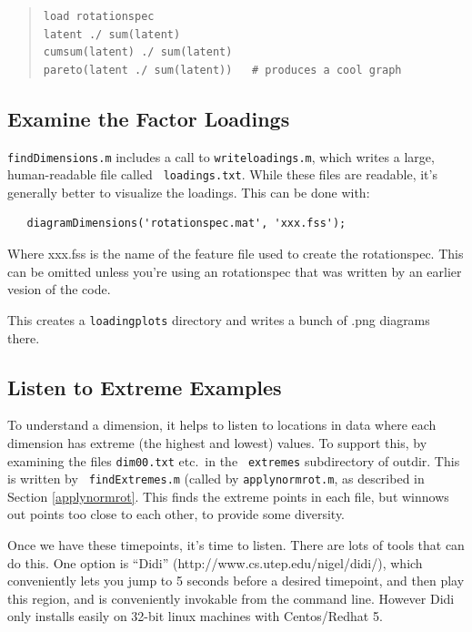 \documentclass[11pt]{article}
\begin{document}
\begin{quote}
\begin{verbatim}
load rotationspec
latent ./ sum(latent) 
cumsum(latent) ./ sum(latent) 
pareto(latent ./ sum(latent))   # produces a cool graph
\end{verbatim}
\end{quote}


\subsection{Examine the Factor Loadings}

{\tt findDimensions.m} includes a call to {\tt writeloadings.m}, which
writes a large, human-readable file called {\tt
  loadings.txt}.  While these files are readable, it's generally better
to visualize the loadings.  This can be done with:

\begin{verbatim}
   diagramDimensions('rotationspec.mat', 'xxx.fss');
\end{verbatim}

Where xxx.fss is the name of the feature file used to create the
rotationspec.  This can be omitted unless you're using an rotationspec
that was written by an earlier vesion of the code.

This creates a {\tt loadingplots} directory and writes a bunch of
.png diagrams there. 

\subsection{Listen to Extreme Examples}

To understand a dimension, it helps to listen to locations in data
where each dimension has extreme (the highest and lowest) values.  To
support this, by examining the files {\tt dim00.txt} etc.\ in the {\tt
  extremes} subdirectory of outdir.  This is written by {\tt
  findExtremes.m} (called by {\tt applynormrot.m}, as described in
Section \ref{applynormrot}.  This finds the extreme points in each
file, but winnows out points too close to each other, to provide some
diversity.

Once we have these timepoints, it's time to listen.  There are lots of
tools that can do this.  One option is ``Didi''
(http://www.cs.utep.edu/nigel/didi/), which conveniently lets you jump
to 5 seconds before a desired timepoint, and then play this region, and
is conveniently invokable from the command line.  However Didi only
installs easily on 32-bit linux machines with Centos/Redhat 5.
\end{document}
